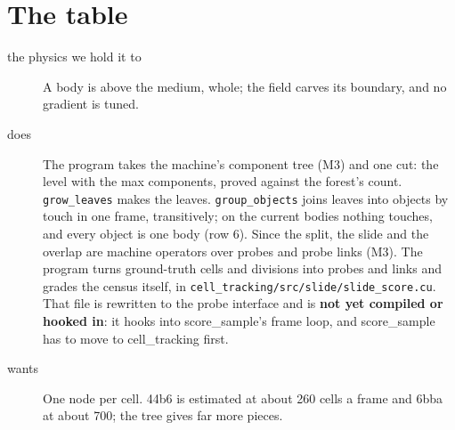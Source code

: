 \section{\texorpdfstring{The table}{The table}}

\begin{description}
\item[{the physics we hold it to}] A body is above the medium, whole; the field carves its boundary, and no gradient is tuned.
\item[{does}] The program takes the machine's component tree (M3) and one cut: the level with the max components, proved against the forest's count. \texttt{grow\_\allowbreak{}leaves} makes the leaves. \texttt{group\_\allowbreak{}objects} joins leaves into objects by touch in one frame, transitively; on the current bodies nothing touches, and every object is one body (row 6). Since the split, the slide and the overlap are machine operators over probes and probe links (M3). The program turns ground-truth cells and divisions into probes and links and grades the census itself, in \texttt{cell\_\allowbreak{}tracking/\allowbreak{}src/\allowbreak{}slide/\allowbreak{}slide\_\allowbreak{}score.\allowbreak{}cu}. That file is rewritten to the probe interface and is \textbf{not yet compiled or hooked in}: it hooks into score\_\allowbreak{}sample's frame loop, and score\_\allowbreak{}sample has to move to cell\_\allowbreak{}tracking first.
\item[{wants}] One node per cell. 44b6 is estimated at about 260 cells a frame and 6bba at about 700; the tree gives far more pieces.

\end{description}

